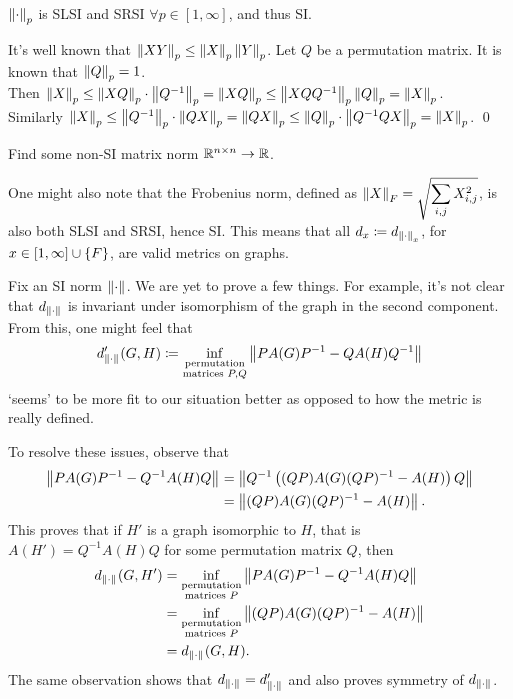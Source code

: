 \begin{prop}
$\left\lVert \cdot \right\rVert_{p}$ is SLSI and SRSI $\forall p\in [1,\infty]$, and thus SI.
\end{prop}
\begin{pf}
It's well known that $\left\lVert XY \right\rVert_{p} \leq \left\lVert X \right\rVert_{p}\left\lVert Y \right\rVert_{p}$. Let $Q$ be a permutation matrix. It is known that $\left\lVert Q \right\rVert_{p} = 1$.\\ 
Then $\left\lVert X \right\rVert_{p} \leq \left\lVert XQ \right\rVert_{p}\cdot\left\lVert Q^{-1} \right\rVert_{p} = \left\lVert XQ \right\rVert_{p} \leq \left\lVert XQQ^{-1} \right\rVert_{p} \left\lVert Q \right\rVert_{p} = \left\lVert X \right\rVert_{p}$. \\
Similarly $\left\lVert X \right\rVert_{p} \leq \left\lVert Q^{-1} \right\rVert_{p}\cdot \left\lVert QX \right\rVert_{p} = \left\lVert QX \right\rVert_{p} \leq \left\lVert Q \right\rVert_{p}\cdot \left\lVert Q^{-1}QX \right\rVert_{p}  = \left\lVert X \right\rVert_{p}$.
\hfill\qed\end{pf}

\begin{qs}
Find some non-SI matrix norm $\mathbb{R}^{n\times n}\to \mathbb{R}$.
\end{qs}

One might also note that the Frobenius norm, defined as $\displaystyle \left\lVert X \right\rVert_{F} = \sqrt{\sum\limits_{i,j}X_{i,j}^2}$, is also both SLSI and SRSI, hence SI. This means that all $d_x \coloneqq d_{\left\lVert \cdot \right\rVert_{x}}$, for $x\in [1,\infty]\cup\left\{F\right\}$, are valid metrics on graphs. 

Fix an SI norm ${\left\lVert \cdot \right\rVert_{}}$. We are yet to prove a few things. For example, it's not clear that $d_{\left\lVert \cdot \right\rVert_{}}$ is invariant under isomorphism of the graph in the second component. From this, one might feel that $$d'_{\left\lVert \cdot \right\rVert_{}}(G,H)\coloneqq \inf_{\substack{\text{permutation}\\\text{matrices }P,Q}}\left\lVert PA(G)P^{-1}-QA(H)Q^{-1} \right\rVert_{}$$ `seems' to be more fit to our situation better as opposed to how the metric is really defined.

To resolve these issues, observe that \begin{align*} 
\left\lVert PA(G)P^{-1}-Q^{-1}A(H)Q \right\rVert_{} &= 
\left\lVert Q^{-1}\left((QP)A(G)(QP)^{-1}-A(H)\right)Q \right\rVert_{} \\
&= \left\lVert (QP)A(G)(QP)^{-1}-A(H) \right\rVert_{}.\end{align*} 
This proves that if $H'$ is a graph isomorphic to $H$, that is $A(H') = Q^{-1}A(H)Q$ for some permutation matrix $Q$, then \begin{align*} d_{\left\lVert \cdot \right\rVert_{}}(G,H') &=
\inf_{\substack{\text{permutation}\\\text{matrices }P}}\left\lVert PA(G)P^{-1}-Q^{-1}A(H)Q \right\rVert_{} \\
&= \inf_{\substack{\text{permutation}\\\text{matrices }P}}\left\lVert (QP)A(G)(QP)^{-1}-A(H) \right\rVert_{} \\
&= d_{\left\lVert \cdot \right\rVert_{}}(G,H).\end{align*}
The same observation shows that $d_{\left\lVert \cdot \right\rVert_{}} = d_{\left\lVert \cdot \right\rVert_{}}'$ and also proves symmetry of $d_{\left\lVert \cdot \right\rVert_{}}$.

